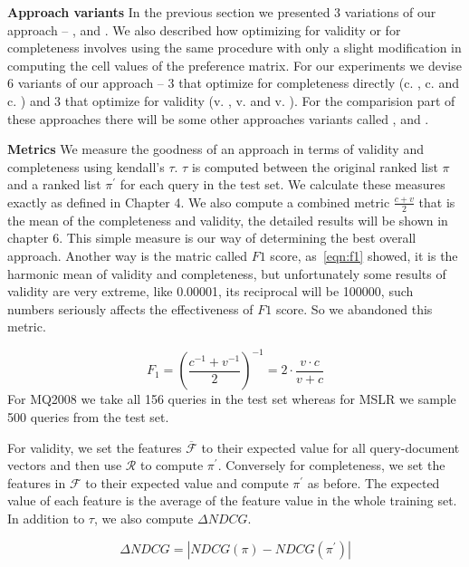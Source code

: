 \textbf{Approach variants} In the previous section we presented 3 variations of our approach -- \greedy, \greedycov and \greedycovep. We also described how optimizing for validity or for completeness involves using the same procedure with only a slight modification in computing the cell values of the preference matrix. For our experiments we devise 6 variants of our approach -- 3 that optimize for completeness directly (c. \greedy, c. \greedycov and c. \greedycovep) and 3 that optimize for validity (v. \greedy, v. \greedycov and v. \greedycovep). For the comparision part of these approaches there will be some other approaches variants called \greedycovall, \greedyback and \normal. 

\textbf{Metrics} We measure the goodness of an approach in terms of validity and completeness using kendall's $\tau$. $\tau$ is computed between the original ranked list $\pi$ and a ranked list $\pi^'$  for each query in the test set. We calculate these measures exactly as defined in Chapter 4. We also compute a combined metric $\frac{c+v}{2}$ that is the mean of the completeness and validity, the detailed results will be shown in chapter 6. This simple measure is our way of determining the best overall approach. Another way is the matric called $F1$ score, as~\eqref{eqn:f1} showed, it is the harmonic mean of validity and completeness, but unfortunately some results of validity are very extreme, like 0.00001, its reciprocal will be 100000, such numbers seriously affects the effectiveness of $F1$ score. So we abandoned this metric.

\begin{equation}\label{eq:validity}
    F_1={(\frac{c^{-1}+v^{-1}}{2})}^{-1}=2\cdot \frac{v \cdot c}{v+c}
\label{eqn:f1}
\end{equation}
For \textsc{MQ2008} we take all 156 queries in the test set whereas for \textsc{MSLR} we sample 500 queries from the test set. 


For validity, we set the features $\overline{\mathcal{F}}$ to their expected value for all query-document vectors and then use $\mathcal{R}$ to compute $\pi^'$. Conversely for completeness, we set the features in $\mathcal{F}$ to their expected value and compute  $\pi^'$ as before. The expected value of each feature is the average of the feature value in the whole training set. In addition to $\tau$, we also compute $\Delta NDCG$.

\begin{equation}
\Delta NDCG = \left | NDCG(\pi ) - NDCG(\pi ^{'})\right  |
\end{equation}

